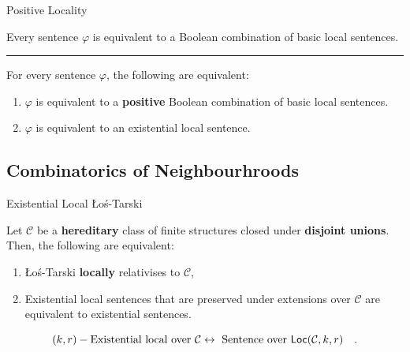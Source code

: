 \documentclass{beamer}
\newcommand{\tightlist}{}
\begin{document}
\begin{frame}{Positive Locality}
    \begin{theorem}
        \vspace{0.1em}
        Every sentence \(\varphi\) is
        equivalent to a Boolean combination of basic local sentences.
    \end{theorem}

    \pause
    \vspace{1em}
    \hrule
    \vspace{0.8em}

    \begin{theorem}
        \vspace{0.1em}
        For every sentence \(\varphi\), the following are
        equivalent:

        \begin{enumerate}
        \tightlist
        \item
          \(\varphi\) is equivalent to a \textbf{positive} Boolean combination
          of basic local sentences.
        \item
          \(\varphi\) is equivalent to an existential local sentence.
        \end{enumerate}
    \end{theorem}
\end{frame}

\subsection{Combinatorics of
Neighbourhroods}\label{combinatorics-of-neighbourhroods}

\begin{frame}{Existential Local Łoś-Tarski}
    \begin{theorem}
        \vspace{0.1em}
        Let $\mathcal{C}$ be a \textbf{hereditary} class of finite structures
        closed under \textbf{disjoint unions}.
        Then, the following are equivalent:
        \begin{enumerate}
            \item 
                Łoś-Tarski \textbf{locally} relativises to
                $\mathcal{C}$,
            \item 
                Existential local sentences that are
                preserved under extensions over $\mathcal{C}$
                are equivalent to existential sentences.
        \end{enumerate}
    \end{theorem}
    \pause
    \begin{equation*}
        (k,r)-\text{Existential local over } \mathcal{C}
        \leftrightarrow
        \text{ Sentence over } \mathsf{Loc}(\mathcal{C},k, r)
        \quad .
    \end{equation*}
\end{frame}
\end{document}
